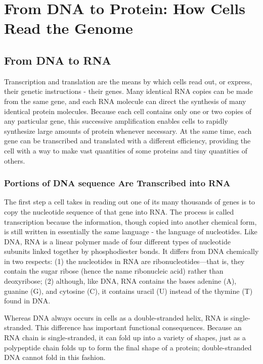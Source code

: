 \chapter{From DNA to Protein: How Cells Read the Genome}

\section{From DNA to RNA}

Transcription and translation are the means by which cells read out, or
express, their genetic instructions - their genes. Many identical RNA copies
can be made from the same gene, and each RNA molecule can direct
the synthesis of many identical protein molecules. Because each cell
contains only one or two copies of any particular gene, this successive
amplification enables cells to rapidly synthesize large amounts of protein
whenever necessary. At the same time, each gene can be transcribed
and translated with a different efficiency, providing the cell with a way
to make vast quantities of some proteins and tiny quantities of others.

\subsection{Portions of DNA sequence Are Transcribed into RNA}

The first step a cell takes in reading out one of its many thousands of
genes is to copy the nucleotide sequence of that gene into RNA. The process
is called transcription because the information, though copied into
another chemical form, is still written in essentially the same language -
the language of nucleotides. Like DNA, RNA is a linear polymer made of
four different types of nucleotide subunits linked together by phosphodiester
bonds. It differs from DNA chemically in two respects:
(1) the nucleotides in RNA are ribonucleotides—that is, they contain the
sugar ribose (hence the name ribonucleic acid) rather than deoxyribose;
(2) although, like DNA, RNA contains the bases adenine (A), guanine (G),
and cytosine (C), it contains uracil (U) instead of the thymine (T) found
in DNA.

Whereas DNA always occurs in cells as a
double-stranded helix, RNA is single-stranded. This difference has important
functional consequences. Because an RNA chain is single-stranded,
it can fold up into a variety of shapes, just as a polypeptide chain folds
up to form the final shape of a protein; double-stranded DNA cannot fold in this fashion.

